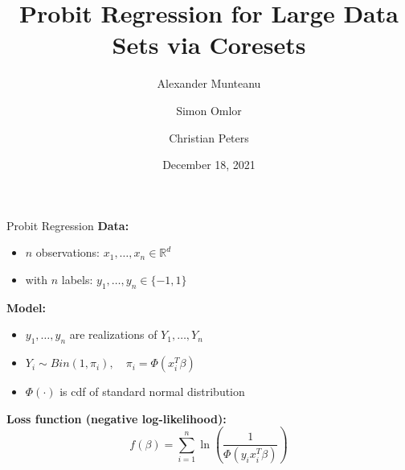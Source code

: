 \documentclass[gray]{beamer}
\title{Probit Regression for Large Data Sets via Coresets}
\author{Alexander Munteanu \and Simon Omlor \and Christian Peters}
\institute{TU Dortmund University, Germany}
\date{December 18, 2021}
\begin{document}
\begin{frame}[noframenumbering]
    \thispagestyle{empty}
    \maketitle
\end{frame}

\begin{frame}{Probit Regression} \pause
    \textbf{Data:}
    \begin{itemize}
        \item $n$ observations: $x_1, \ldots, x_n \in \mathbb{R}^d$ \\
        \item with $n$ labels: $y_1, \ldots, y_n \in \{-1, 1\}$
    \end{itemize}

    \pause

    \vspace{\fill}

    \textbf{Model:}
    \begin{itemize}
        \item $y_1, \ldots, y_n$ are realizations of $Y_1, \ldots, Y_n$
        \item $Y_i \sim Bin(1, \pi_i), \quad \pi_i = \Phi(x_i^T \beta)$
        \item $\Phi(\cdot)$ is cdf of standard normal distribution
    \end{itemize}

    \pause

    \vspace{\fill}

    \textbf{Loss function (negative log-likelihood):}
    \begin{equation*}
        f(\beta) = \sum_{i=1}^n \ln\left( \frac{1}{\Phi(y_ix_i^T\beta)} \right)
    \end{equation*}
\end{frame}
\end{document}
